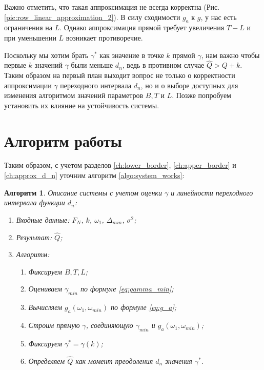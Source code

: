 \documentclass[specialist, substylefile = spbu.rtx,
			   subf, href, 12pt]{disser}
\newtheorem{algorithm}{Алгоритм}
\begin{document}
Важно отметить, что такая аппроксимация не всегда корректна (Рис. \ref{pic:row_linear_approximation_2}). В силу сходимости $ g_a $ к $ g $, у нас есть ограничения на $ L $. Однако аппроксимация прямой требует увеличения $ T - L $ и при уменьшении $ L $ возникает противоречие.

Поскольку мы хотим брать $ \gamma^* $ как значение в точке $ k $ прямой $ \gamma $, нам важно чтобы первые $ k $ значений $ \gamma $ были меньше $ d_n $, ведь в противном случае $ \hat{Q} > Q+k $. Таким образом на первый план выходит вопрос не только о корректности аппроксимации $ \gamma $ переходного интервала $ d_n $, но и о выборе доступных для изменения алгоритмом значений параметров $ B, T $ и $ L $. Позже попробуем установить их влияние на устойчивость системы.

\section{Алгоритм работы}
Таким образом, с учетом разделов \ref{ch:lower_border}, \ref{ch:apper_border} и \ref{ch:approx_d_n} уточним алгоритм \ref{algo:system_works}:

\begin{algorithm}\label{algo:system_works_final}
	Описание системы с учетом оценки $ \gamma $ и линейности переходного интервала функции $ d_n $:
	\begin{enumerate}
		\item Входные данные: $ F_N $, $ k $, $ \omega_1 $, $ \Delta_{min} $, $ \sigma^2 $;
		\item Результат: $ \hat{Q }$;
		\item Алгоритм:
		\begin{enumerate}
			\item Фиксируем $ B, T, L $;
			\item Оцениваем $ \gamma_{min} $ по формуле \eqref{eq:gamma_min};
			\item Вычисляем $ g_a(\omega_1, \omega_{min}) $ по формуле \eqref{eq:g_a};
			\item Строим прямую $ \gamma $, соединяющую $ \gamma_{min} $ и $ g_a(\omega_1, \omega_{min}) $;
			\item Фиксируем $ \gamma^* = \gamma(k) $;
			\item Определяем $ \hat{Q} $ как момент преодоления $ d_n $ значения $ \gamma^* $.
		\end{enumerate}	
	\end{enumerate}
\end{algorithm}
\end{document}
